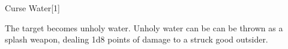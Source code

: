 \begin{spellsection}{Curse Water}[1]

\begin{spellcontent}

\begin{spelltargetinginfo}



\end{spelltargetinginfo}


\begin{spelleffects}



\spelleffect
The target becomes unholy water.
Unholy water can be can be thrown as a splash weapon, dealing 1d8 points of damage to a struck good outsider.








\end{spelleffects}

\end{spellcontent}
\begin{spellfooter}


\end{spellfooter}
\begin{spellsubcontent}


\end{spellsubcontent}
\end{spellsection}


